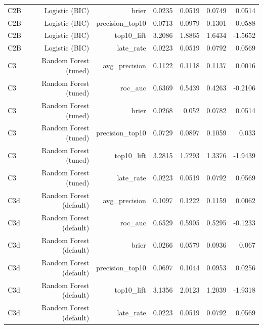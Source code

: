 \begin{table}[htbp]
\begin{tabular}{lrrrrrr}
C2B & Logistic (BIC) & brier & 0.0235 & 0.0519 & 0.0749 & 0.0514 \\
C2B & Logistic (BIC) & precision\_top10 & 0.0713 & 0.0979 & 0.1301 & 0.0588 \\
C2B & Logistic (BIC) & top10\_lift & 3.2086 & 1.8865 & 1.6434 & -1.5652 \\
C2B & Logistic (BIC) & late\_rate & 0.0223 & 0.0519 & 0.0792 & 0.0569 \\
C3 & Random Forest (tuned) & avg\_precision & 0.1122 & 0.1118 & 0.1137 & 0.0016 \\
C3 & Random Forest (tuned) & roc\_auc & 0.6369 & 0.5439 & 0.4263 & -0.2106 \\
C3 & Random Forest (tuned) & brier & 0.0268 & 0.052 & 0.0782 & 0.0514 \\
C3 & Random Forest (tuned) & precision\_top10 & 0.0729 & 0.0897 & 0.1059 & 0.033 \\
C3 & Random Forest (tuned) & top10\_lift & 3.2815 & 1.7293 & 1.3376 & -1.9439 \\
C3 & Random Forest (tuned) & late\_rate & 0.0223 & 0.0519 & 0.0792 & 0.0569 \\
C3d & Random Forest (default) & avg\_precision & 0.1097 & 0.1222 & 0.1159 & 0.0062 \\
C3d & Random Forest (default) & roc\_auc & 0.6529 & 0.5905 & 0.5295 & -0.1233 \\
C3d & Random Forest (default) & brier & 0.0266 & 0.0579 & 0.0936 & 0.067 \\
C3d & Random Forest (default) & precision\_top10 & 0.0697 & 0.1044 & 0.0953 & 0.0256 \\
C3d & Random Forest (default) & top10\_lift & 3.1356 & 2.0123 & 1.2039 & -1.9318 \\
C3d & Random Forest (default) & late\_rate & 0.0223 & 0.0519 & 0.0792 & 0.0569 \\
\bottomrule
\end{tabular}
\par\smallskip\begin{minipage}{\linewidth}\footnotesize \end{minipage}
\end{table}

